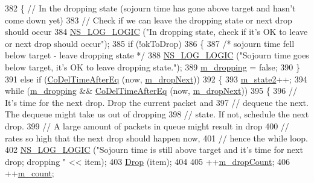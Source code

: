\begin{DoxyCode}
382     \{ \textcolor{comment}{// In the dropping state (sojourn time has gone above target and hasn't come down yet)}
383       \textcolor{comment}{// Check if we can leave the dropping state or next drop should occur}
384       \hyperlink{group__logging_ga88acd260151caf2db9c0fc84997f45ce}{NS\_LOG\_LOGIC} (\textcolor{stringliteral}{"In dropping state, check if it's OK to leave or next drop should occur"});
385       \textcolor{keywordflow}{if} (!okToDrop)
386         \{
387           \textcolor{comment}{/* sojourn time fell below target - leave dropping state */}
388           \hyperlink{group__logging_ga88acd260151caf2db9c0fc84997f45ce}{NS\_LOG\_LOGIC} (\textcolor{stringliteral}{"Sojourn time goes below target, it's OK to leave dropping state."});
389           \hyperlink{classns3_1_1CoDelQueueDisc_ae6b02968204bd5c2e6d68e532ce679c4}{m\_dropping} = \textcolor{keyword}{false};
390         \}
391       \textcolor{keywordflow}{else} \textcolor{keywordflow}{if} (\hyperlink{classns3_1_1CoDelQueueDisc_a5b022a23de13e1ac587488136756b86a}{CoDelTimeAfterEq} (now, \hyperlink{classns3_1_1CoDelQueueDisc_afb812be3b2ea5064053bdc884144965d}{m\_dropNext}))
392         \{
393           \hyperlink{classns3_1_1CoDelQueueDisc_afbccfc67434a2b3767ef21fb33beeb86}{m\_state2}++;
394           \textcolor{keywordflow}{while} (\hyperlink{classns3_1_1CoDelQueueDisc_ae6b02968204bd5c2e6d68e532ce679c4}{m\_dropping} && \hyperlink{classns3_1_1CoDelQueueDisc_a5b022a23de13e1ac587488136756b86a}{CoDelTimeAfterEq} (now, 
      \hyperlink{classns3_1_1CoDelQueueDisc_afb812be3b2ea5064053bdc884144965d}{m\_dropNext}))
395             \{
396               \textcolor{comment}{// It's time for the next drop. Drop the current packet and}
397               \textcolor{comment}{// dequeue the next. The dequeue might take us out of dropping}
398               \textcolor{comment}{// state. If not, schedule the next drop.}
399               \textcolor{comment}{// A large amount of packets in queue might result in drop}
400               \textcolor{comment}{// rates so high that the next drop should happen now,}
401               \textcolor{comment}{// hence the while loop.}
402               \hyperlink{group__logging_ga88acd260151caf2db9c0fc84997f45ce}{NS\_LOG\_LOGIC} (\textcolor{stringliteral}{"Sojourn time is still above target and it's time for next drop;
       dropping "} << item);
403               \hyperlink{classns3_1_1QueueDisc_a4e8bbd3afbd927df3342dd015f30b08c}{Drop} (item);
404 
405               ++\hyperlink{classns3_1_1CoDelQueueDisc_ae61e9b4326d0f0b7db697c1e44e1336f}{m\_dropCount};
406               ++\hyperlink{classns3_1_1CoDelQueueDisc_a87a17c1b3df276df0a43a4270ee6515c}{m\_count};

\end{DoxyCode}
